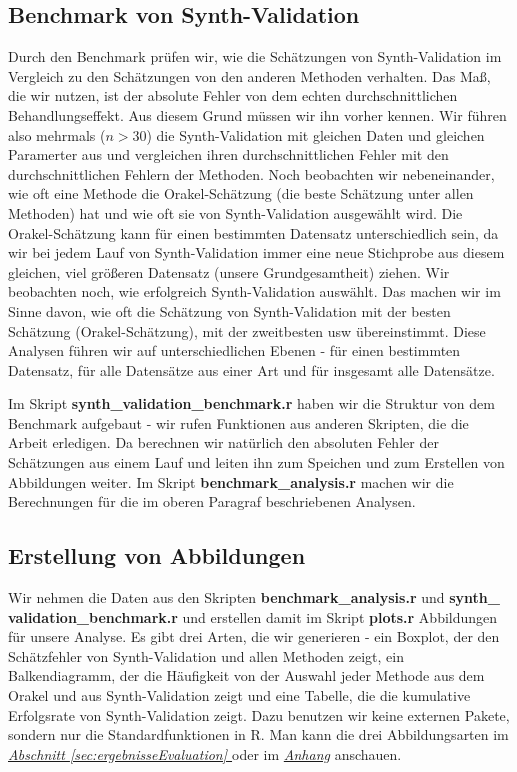 \documentclass[12pt,a4paper,twoside]{scrartcl}
\numberwithin{equation}{section}
\newcommand{\refsec}[1]{\emph{\hyperref[#1]{Abschnitt \ref*{#1} }}}
\begin{document}
  	\subsection{Benchmark von Synth-Validation}\label{subsec:benchmarkSynthValidation}
Durch den Benchmark prüfen wir, wie die Schätzungen von Synth-Validation im Vergleich zu den Schätzungen von den anderen Methoden verhalten. Das Maß, die wir nutzen, ist der absolute Fehler von dem echten durchschnittlichen Behandlungseffekt. Aus diesem Grund müssen wir ihn vorher kennen. Wir führen also mehrmals ($n>30$) die Synth-Validation mit gleichen Daten und gleichen Paramerter aus und vergleichen ihren durchschnittlichen Fehler mit den durchschnittlichen Fehlern der Methoden. Noch beobachten wir nebeneinander, wie oft eine Methode die Orakel-Schätzung (die beste Schätzung unter allen Methoden) hat und wie oft sie von Synth-Validation ausgewählt wird. Die Orakel-Schätzung kann für einen bestimmten Datensatz unterschiedlich sein, da wir bei jedem Lauf von Synth-Validation immer eine neue Stichprobe aus diesem gleichen, viel größeren Datensatz (unsere Grundgesamtheit) ziehen. Wir beobachten noch, wie erfolgreich Synth-Validation auswählt. Das machen wir im Sinne davon, wie oft die Schätzung von Synth-Validation mit der besten Schätzung (Orakel-Schätzung), mit der zweitbesten usw übereinstimmt. Diese Analysen führen wir auf unterschiedlichen Ebenen - für einen bestimmten Datensatz, für alle Datensätze aus einer Art und für insgesamt alle Datensätze.\par 

\noindent
Im Skript \textbf{synth\_validation\_benchmark.r} haben wir die Struktur von dem Benchmark aufgebaut - wir rufen Funktionen aus anderen Skripten, die die Arbeit erledigen. Da berechnen wir natürlich den absoluten Fehler der Schätzungen aus einem Lauf und leiten ihn zum Speichen und zum Erstellen von Abbildungen weiter. Im Skript \textbf{benchmark\_analysis.r} machen wir die Berechnungen für die im oberen Paragraf beschriebenen Analysen. \par 

\subsection{Erstellung von Abbildungen}\label{subsec:erstellungAbbildungen}

Wir nehmen die Daten aus den Skripten \textbf{benchmark\_analysis.r} und \textbf{synth\_\\validation\_benchmark.r} und erstellen damit im Skript \textbf{plots.r} Abbildungen für unsere Analyse. Es gibt drei Arten, die wir generieren - ein Boxplot, der den Schätzfehler von Synth-Validation und allen Methoden zeigt, ein Balkendiagramm, der die Häufigkeit von der Auswahl jeder Methode aus dem Orakel und aus Synth-Validation zeigt und eine Tabelle, die die kumulative Erfolgsrate von Synth-Validation zeigt. Dazu benutzen wir keine externen Pakete, sondern nur die Standardfunktionen in R. Man kann die drei Abbildungsarten im \refsec{sec:ergebnisseEvaluation} oder im \emph{\hyperref[anhang]{Anhang}} anschauen. 
\end{document}
